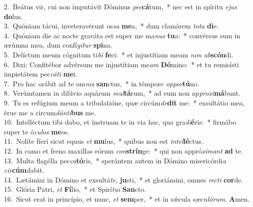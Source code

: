 {2.~}Beátus vir, cui non imputávit Dóminus \textit{pec}\textbf{cá}tum,~* nec est in spíritu \textit{e}\textit{jus} \textbf{do}lus.\\
{3.~}Quóniam tácui, inveteravérunt os\textit{sa} \textbf{me}a,~* dum clamárem \textit{to}\textit{ta} \textbf{di}e.\\
{4.~}Quóniam die ac nocte graváta est super me ma\textit{nus} \textbf{tu}a:~* convérsus sum in ærúmna mea, dum confí\textit{gi}\textit{tur} \textbf{spi}na.\\
{5.~}Delíctum meum cógnitum ti\textit{bi} \textbf{fe}ci:~* et injustítiam meam \textit{non} \textit{ab}\textbf{scón}di.\\
{6.~}Dixi: Confitébor advérsum me injustítiam me\textit{am} \textbf{Dó}mino:~* et tu remisísti impietátem pec\textit{cá}\textit{ti} \textbf{me}i.\\
{7.~}Pro hac orábit ad te om\textit{nis} \textbf{san}ctus,~* in témpore \textit{op}\textit{por}\textbf{tú}no.\\
{8.~}Verúmtamen in dilúvio aquárum \textit{mul}\textbf{tá}rum,~* ad eum non ap\textit{pro}\textit{xi}\textbf{má}bunt.\\
{9.~}Tu es refúgium meum a tribulatióne, quæ circúm\textit{de}\textbf{dit} me:~* exsultátio mea, érue me a circum\textit{dán}\textit{ti}\textbf{bus} me.\\
{10.~}Intelléctum tibi dabo, et ínstruam te in via hac, qua gra\textit{di}\textbf{é}ris:~* firmábo super te ó\textit{cu}\textit{los} \textbf{me}os.\\
{11.~}Nolíte fíeri sicut equus \textit{et} \textbf{mu}lus,~* quibus non est \textit{in}\textit{tel}\textbf{lé}ctus.\\
{12.~}In camo et freno maxíllas eórum \textit{con}\textbf{strín}ge:~* qui non appró\textit{xi}\textit{mant} \textbf{ad} te.\\
{13.~}Multa flagélla pec\textit{ca}\textbf{tó}ris,~* sperántem autem in Dómino misericórdi\textit{a} \textit{cir}\textbf{cúm}dabit.\\
{14.~}Lætámini in Dómino et exsultá\textit{te}, \textbf{ju}sti,~* et gloriámini, omnes \textit{re}\textit{cti} \textbf{cor}de.\\
{15.~}Glória Patri, \textit{et} \textbf{Fí}lio,~* et Spirí\textit{tu}\textit{i} \textbf{San}cto.\\
{16.~}Sicut erat in princípio, et nunc, \textit{et} \textbf{sem}per,~* et in sǽcula sæcu\textit{ló}\textit{rum}. \textbf{A}men.\\
